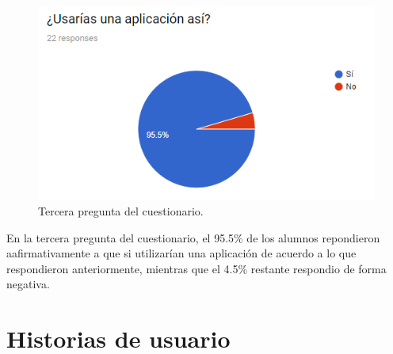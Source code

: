 \begin{figure}[H]
	\begin{center}
		\includegraphics[scale=0.6]{img/pregunta3.png} 
		\caption{Tercera pregunta del cuestionario.}
		\label{p3}
	\end{center}
\end{figure}
En la tercera pregunta del cuestionario, el 95.5\% de los alumnos repondieron aafirmativamente a que si utilizarían una aplicación de acuerdo a lo que respondieron anteriormente, mientras que el 4.5\% restante respondio de forma negativa.

\section{Historias de usuario}


